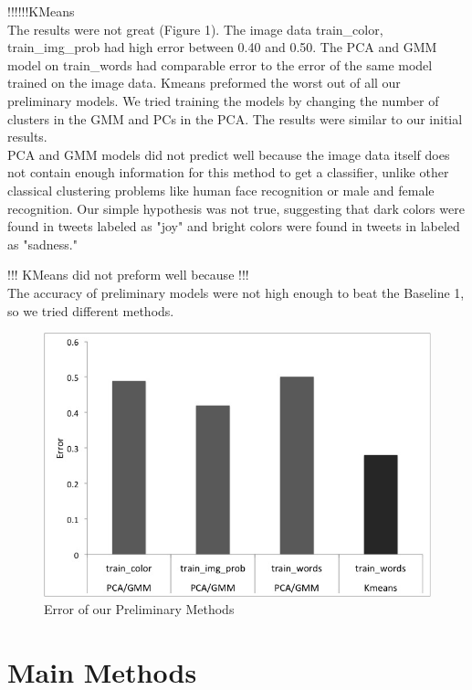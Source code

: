 \documentclass[]{article}
\begin{document}
!!!!!!KMeans  \\


The results were not great (Figure 1). The image data train\_color, train\_img\_prob had high error between 0.40 and 0.50. The PCA and GMM model on train\_words had comparable error to the error of the same model trained on the image data. Kmeans preformed the worst out of all our preliminary models. We tried training the models by changing the number of clusters in the GMM and PCs in the PCA. The results were similar to our initial results. \\


PCA and GMM models did not predict well because the image data itself does not contain enough information for this method to get a classifier, unlike other classical clustering problems like human face recognition or male and female recognition. Our simple hypothesis was not true, suggesting that dark colors were found in tweets labeled as "joy" and bright colors were found in tweets in labeled as "sadness." 

!!! KMeans did not preform well  because !!! \\

The accuracy of preliminary models were not high enough to beat the Baseline 1, so we tried different methods.

\begin{figure}
	\centering
  \includegraphics[scale=0.4]{trainingerror.jpg}
  \caption{Error of our Preliminary Methods}
  \label{fig:Error}
\end{figure}

\section{Main Methods}
\end{document}
